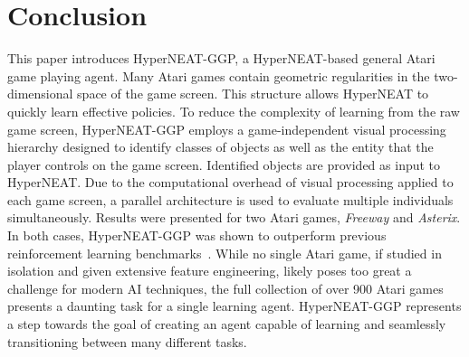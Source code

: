 \documentclass{acm_proc_article-sp}
\begin{document}
\section{Conclusion}
\label{sec:conclusion}
This paper introduces HyperNEAT-GGP, a HyperNEAT-based general Atari game playing agent. Many Atari games contain geometric regularities in the two-dimensional space of the game screen. This structure allows HyperNEAT to quickly learn effective policies. To reduce the complexity of learning from the raw game screen, HyperNEAT-GGP employs a game-independent visual processing hierarchy designed to identify classes of objects as well as the entity that the player controls on the game screen. Identified objects are provided as input to HyperNEAT. Due to the computational overhead of visual processing applied to each game screen, a parallel architecture is used to evaluate multiple individuals simultaneously. Results were presented for two Atari games, \textit{Freeway} and \textit{Asterix}. In both cases, HyperNEAT-GGP was shown to outperform previous reinforcement learning benchmarks~\cite{naddaf10}. While no single Atari game, if studied in isolation and given extensive feature engineering, likely poses too great a challenge for modern AI techniques, the full collection of over 900 Atari games presents a daunting task for a single learning agent. HyperNEAT-GGP represents a step towards the goal of creating an agent capable of learning and seamlessly transitioning between many different tasks.



%

\end{document}
